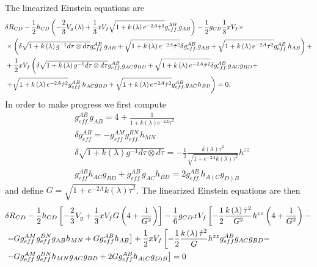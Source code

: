 \documentclass[10 pt]{article}
\begin{document}
The linearized Einstein equations are
\begin{align}
& \delta R_{CD} - \frac{1}{2} h_{CD} \left( - \frac{2}{3} V_g \left(\lambda\right) + \frac{1}{3} x V_f \sqrt{1 + k\left(\lambda\right) e^{-2A} \dot{\tau}^2} g_{eff.}^{AB} g_{AB} \right) - \frac{1}{2} g_{CD} \frac{1}{3} x V_f \times \notag \\
& \times \left( \delta  \sqrt{1 + k\left(\lambda\right) g^{-1} d \tau \otimes d \tau} g_{eff.}^{AB}g_{AB} +  \sqrt{1 + k\left(\lambda\right) e^{-2A} \dot{\tau}^2} \delta g_{eff.}^{AB} g_{AB} +  \sqrt{1 + k\left(\lambda\right) e^{-2A} \dot{\tau}^2} g^{AB}_{eff.} h_{AB} \right) + \notag \\
& + \frac{1}{2} x V_f \left(  \delta  \sqrt{1 + k\left(\lambda\right) g^{-1} d \tau \otimes d \tau} g_{eff.}^{AB} g_{AC} g_{BD} +  \sqrt{1 + k\left(\lambda\right) e^{-2A} \dot{\tau}^2} \delta g_{eff.}^{AB} g_{AC} g_{BD} + \right. \notag \\
&\left. +  \sqrt{1 + k\left(\lambda\right) e^{-2A} \dot{\tau}^2} g_{eff.}^{AB} h_{AC} g_{BD} +  \sqrt{1 + k\left(\lambda\right) e^{-2A} \dot{\tau}^2} g_{eff.}^{AB} g_{AC} h_{BD}\right) = 0.
\end{align}
In order to make progress we first compute
\begin{align}
&g_{eff.}^{AB} g_{AB} = 4 + \frac{1}{1 + k\left( \lambda \right) e^{-2A} {\dot{\tau}}^2} \\
& \delta g_{eff}^{AB} = - g_{eff}^{AM} g_{eff.}^{BN} h_{MN} \\
& \delta  \sqrt{1 + k\left(\lambda\right) g^{-1} d \tau \otimes d \tau} = - \frac{1}{2} \frac{k\left( \lambda \right) {\dot{\tau}}^2}{\sqrt{1+e^{-2A} k\left(\lambda\right) {\dot{\tau}}^2}} h^{zz} \\
& g_{eff}^{AB}h_{AC}g_{BD} + g_{eff.}^{AB} g_{AC} h_{BD} = 2 g_{eff.}^{AB} h_{A\left(C\right.}g_{\left.D\right)B}
\end{align}
and define $G = \sqrt{1+e^{-2A} k\left(\lambda\right) {\dot{\tau}}^2}$. The linearized Einstein equations are then
\begin{align}
&\delta R_{CD} - \frac{1}{2} h_{CD} \left[ -\frac{2}{3} V_g + \frac{1}{3} x V_f G \left(4 + \frac{1}{G^2} \right)\right] - \frac{1}{6} g_{CD} x V_f \left[ -\frac{1}{2} \frac{k\left(\lambda\right) {\dot{\tau}}^2}{G^2} h^{zz} \left(4 + \frac{1}{G^2}\right) - \right. \notag \\
& \left. - G g_{eff}^{AM} g_{eff}^{BN} g_{AB} h_{MN} + G g_{eff}^{AB} h_{AB}  \right]  + \frac{1}{2} x V_f \left[ - \frac{1}{2} \frac{k\left(\lambda\right) {\dot{\tau}}^2}{G} h^{zz} g_{eff}^{AB} g_{AC} g_{BD}  - \right. \notag \\
&\left. - G g_{eff}^{AM} g_{eff}^{BN} h_{MN} g_{AC} g_{BD} + 2 G g_{eff}^{AB} h_{A(C}g_{D)B} \right] = 0
\end{align}
\end{document}
